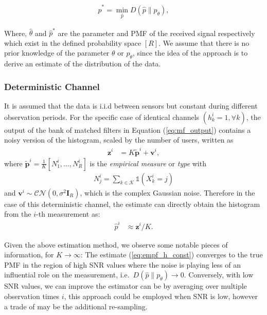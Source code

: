 \documentclass{article}
\begin{document}
\begin{align}
\hat{p}^* = \min_{\hat{p}} D(\hat{p}\|p_{\theta}),  
\end{align}

Where, $\hat{\theta}$ and $\hat{p}^*$ are the parameter and PMF of the received signal respectively which exist in the defined probability space $[R]$.  We assume that there is no prior knowledge of the parameter $\theta$ or $p_{\theta}$, since the idea of the approach is to derive an estimate of the distribution of the data.


\subsubsection{Deterministic Channel}

It is assumed that the data is i.i.d between sensors but constant during different observation periods. For the specific case of identical channels ${(h^i_k = 1, \forall k)}$, the output of the bank of matched filters in Equation (\ref{eq:mf_output}) contains a noisy version of the histogram, scaled by the number of users, written as
%
\begin{align}
    \boldsymbol{z}^i &= K \tilde{\boldsymbol{p}}^i + \boldsymbol{v}^i, 
\end{align}
%
where $\tilde{\boldsymbol{p}}^i = \frac{1}{K}[N_1^i, \ldots, N_R^i]$ is the \emph{empirical measure} or \emph{type} with
\begin{align}
    N_j^i = \sum_{k \in \mathcal{K}}\mathbb{1}(X^i_k = j)
\end{align}
and $\boldsymbol{v}^i \sim \mathcal{CN}(0, {\sigma^2 \boldsymbol{I}_R})$, which is the complex Gaussian noise.
%
Therefore in the case of this deterministic channel, the estimate can directly obtain the histogram from the $i$-th measurement as:
%
\begin{align}
    \hat{p}^i &\approx \boldsymbol{z}^i / K. \label{eq:empf_h_const}
\end{align}

Given the above estimation method, we observe some notable pieces of information, for $K \rightarrow \infty$: The estimate (\ref{eq:empf_h_const}) converges to the true PMF in the region of high SNR values where the noise is playing less of an influential role on the measurement, i.e.~$D(\hat{p}\| p_{\theta}) \rightarrow 0$. Conversely, with low SNR values, we can improve the estimator can be by averaging over multiple observation times $i$, this approach could be employed when SNR is low, however a trade of may be the additional re-sampling. 
\end{document}
